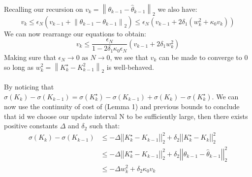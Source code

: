 \documentclass{article}[12pt]
\newcommand{\twonorm}[1]{\left|\left|#1\right|\right|_2}
\begin{document}
Recalling our recursion on $v_{k}=\left\|\theta_{k-1}-\hat{\theta}_{k-1}\right\|_{2}$ we also have:
\begin{equation}\label{eq:30}
    v_{k} \leq \epsilon_{N}\left(v_{k-1}+\left\|\theta_{k-1}-\theta_{k-1}\right\|_{2}\right) \leq \epsilon_{N}\left(v_{k-1}+2 \delta_{1}\left(w_{k}^{2}+\kappa_{0} v_{k}\right)\right)
\end{equation}
We can now rearrange our equations to obtain:
\begin{equation}\label{eq:31}
    v_{k} \leq \frac{\epsilon_{N}}{1-2 \delta_{1} \kappa_{0} \epsilon_{N}}\left(v_{k-1}+2 \delta_{1} w_{k}^{2}\right)
\end{equation}
Making sure that $\epsilon_{N} \rightarrow 0 \text { as } N \rightarrow 0$, we see that $v_k$ can be made to converge to 0 so long as $w_{k}^{2}=\left\|K_{k}^{\star}-K_{k-1}^{2}\right\|_{2}$ is well-behaved.
\\ \\
By noticing that $\sigma(K_k)-\sigma(K_{k-1})=\sigma(K_k^\star)-\sigma(K_{k-1})+\sigma(K_k)-\sigma(K_k^\star)$. We can now use the continuity of cost of (Lemma 1) and previous bounds to conclude that id we choose our update interval N to be sufficiently large, then there exists positive constants $\Delta$ and $\delta_2$ such that:
\begin{equation} \label{eq:32}
\begin{split}
\sigma(K_k) - \sigma(K_{k-1}) &\leq -\Delta \twonorm{K_k^\star-K_{k-1}}^2+\delta_2\twonorm{K_k^\star-K_k}^2 \\
&\leq -\Delta \twonorm{K_k^\star-K_{k-1}}^2+\delta_2\twonorm{\theta_{k-1}-\hat{\theta}_{k-1}}^2 \\
&\leq -\Delta w_k ^2+\delta_2\kappa_0 v_k
\end{split}
\end{equation}
\end{document}
